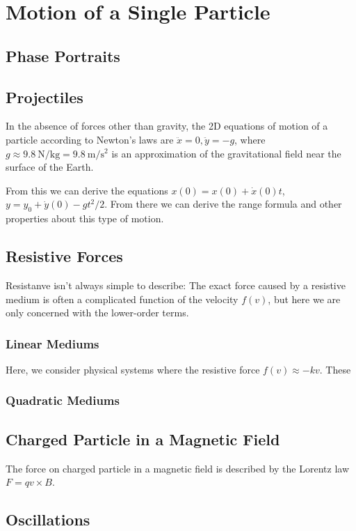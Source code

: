 \chapter{Motion of a Single Particle}

\section{Phase Portraits}



\section{Projectiles}

In the absence of forces other than gravity, the 2D equations of motion of a particle according to Newton's laws are $\ddot x = 0, \ddot y = -g$, where $g \approx \SI{9.8}{\newton\per\kilogram} = \SI{9.8}{\meter\per\second\squared}$ is an approximation of the gravitational field near the surface of the Earth.

From this we can derive the equations $x(0) = x(0) + \dot x(0)t$, $y = y_0 + \dot y(0) - gt^2/2$. From there we can derive the range formula and other properties about this type of motion.

\section{Resistive Forces}

Resistanve isn't always simple to describe: The exact force caused by a resistive medium is often a complicated function of the velocity $f(v)$, but here we are only concerned with the lower-order terms.

\subsection{Linear Mediums}

Here, we consider physical systems where the resistive force $f(v) \approx -kv$. These 

\subsection{Quadratic Mediums}

\section{Charged Particle in a Magnetic Field}

The force on charged particle in a magnetic field is described by the Lorentz law $F = qv \times B$. 

\section{Oscillations}

